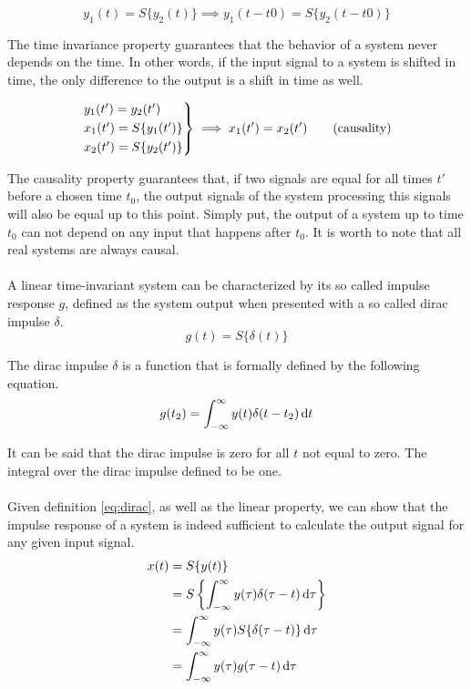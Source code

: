 \[y_1(t) = S\{y_2(t)\} \implies y_1(t - t0) = S\{y_2(t - t0)\} \tag{time invariance}\]

The time invariance property guarantees that the behavior of a system never depends on the time. In other words, if the input signal to a system is shifted in time, the only difference to the output is a shift in time as well.

\[
\begin{rcases*}
y_1(t') = y_2(t') \\
x_1(t') = S\{y_1(t')\} \\ 
x_2(t') = S\{y_2(t')\} \\
\end{rcases*} \implies x_1(t') = x_2(t') \tag{causality}\]

The causality property guarantees that, if two signals are equal for all times $t'$ before a chosen time $t_0$, the output signals of the system processing this signals will also be equal up to this point. Simply put, the output of a system up to time $t_0$ can not depend on any input that happens after $t_0$. It is worth to note that all real systems are always causal. 
\\ \\
A linear time-invariant system can be characterized by its so called impulse response $g$, defined as the system output when presented with a so called dirac impulse $\delta$.
\[g(t) = S\{\delta(t)\}\]

The dirac impulse $\delta$ is a function that is formally defined by the following equation. 
\begin{align}
g(t_2) = \int_{-\infty}^{\infty} y(t)\delta(t - t_2) \mathop{}\!\mathrm{d} t \label{eq:dirac} 
\end{align}


It can be said that the dirac impulse is zero for all $t$ not equal to zero. The integral over the dirac impulse defined to be one. 
\\ \\
Given definition \ref{eq:dirac}, as well as the linear property, we can show that the impulse response of a system is indeed sufficient to calculate the output signal for any given input signal. 
\begin{align*}
x(t) &= S\{y(t)\} \\
	 &= S\left\{\int_{-\infty}^{\infty} y(\tau)\delta(\tau - t) \mathop{}\!\mathrm{d}\tau \right\} \\
	 &= \int_{-\infty}^{\infty} y(\tau)S\{\delta(\tau - t)\} \mathop{}\!\mathrm{d}\tau \\
	 &= \int_{-\infty}^{\infty} y(\tau)g(\tau - t) \mathop{}\!\mathrm{d}\tau
\end{align*}

